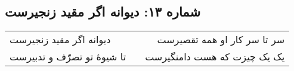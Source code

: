\begin{center}
\section*{شماره ۱۳: دیوانه اگر مقید زنجیرست}
\label{sec:013}
\begin{longtable}{l p{0.5cm} r}
دیوانه اگر مقید زنجیرست
&&
سر تا سر کار او همه تقصیرست
\\
تا شیوهٔ تو تصرّف و تدبیرست
&&
یک یک چیزت که هست دامنگیرست
\\
\end{longtable}
\end{center}
